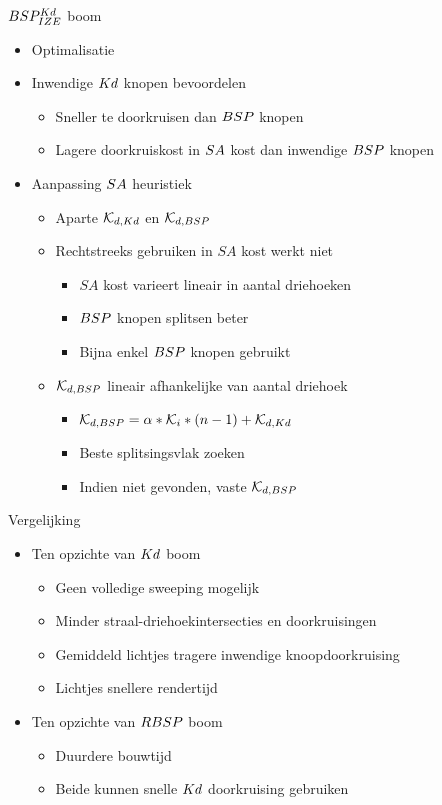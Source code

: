 \documentclass[11pt,t]{beamer}
\begin{document}
\begin{frame}{$BSP^{Kd}_{IZE}$ boom}
	\begin{itemize}
	\item Optimalisatie
	\item Inwendige $Kd$ knopen bevoordelen
		\begin{itemize}
			\item Sneller te doorkruisen dan $BSP$ knopen
			\item Lagere doorkruiskost in $SA$ kost dan inwendige $BSP$ knopen
		\end{itemize}
	\item Aanpassing $SA$ heuristiek
		\begin{itemize}
			\item Aparte $\mathcal{K}_{d,Kd}$ en $\mathcal{K}_{d,BSP}$
			\item Rechtstreeks gebruiken in $SA$ kost werkt niet
			\begin{itemize}
				\item $SA$ kost varieert lineair in aantal driehoeken
				\item $BSP$ knopen splitsen beter
				\item Bijna enkel $BSP$ knopen gebruikt
			\end{itemize}
			\item $\mathcal{K}_{d,BSP}$ lineair afhankelijke van aantal driehoek
			\begin{itemize}
				\item $\mathcal{K}_{d,BSP} = \alpha * \mathcal{K}_i * (n - 1) + \mathcal{K}_{d,Kd}$
				\item Beste splitsingsvlak zoeken
				\item Indien niet gevonden, vaste $\mathcal{K}_{d,BSP}$
			\end{itemize}
		\end{itemize}
	\end{itemize}
\end{frame}

\begin{frame}{Vergelijking}
	\begin{itemize}
	\item Ten opzichte van $Kd$ boom
		\begin{itemize}
			\item Geen volledige sweeping mogelijk
			\item Minder straal-driehoekintersecties en doorkruisingen
			\item Gemiddeld lichtjes tragere inwendige knoopdoorkruising
			\item Lichtjes snellere rendertijd
		\end{itemize}
	\item Ten opzichte van $RBSP$ boom
		\begin{itemize}
			\item Duurdere bouwtijd
			\item Beide kunnen snelle $Kd$ doorkruising gebruiken
		\end{itemize}
	\end{itemize}
\end{frame}
\end{document}
